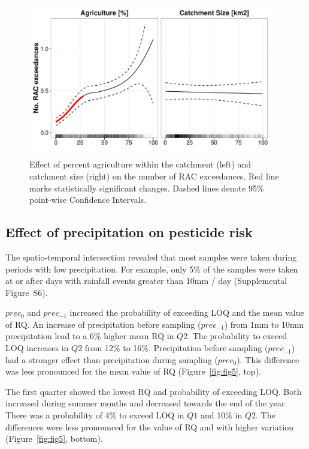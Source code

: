 \documentclass[journal=esthag,manuscript=article]{achemso}
\begin{document}
\begin{figure}[ht]
  \includegraphics[width=0.95\textwidth]{figure4.pdf}
  \caption{Effect of percent agriculture within the catchment (left) and catchment size (right) on the number of RAC exceedances. Red line marks statistically significant changes. Dashed lines denote 95\% point-wise Confidence Intervals.
  }
  \label{fig:fig4}
\end{figure}


\subsection{Effect of precipitation on pesticide risk}
The spatio-temporal intersection revealed that most samples were taken during periods with low precipitation.
For example, only 5\% of the samples were taken at or after days with rainfall events greater than 10mm / day (Supplemental Figure~S6). 

$prec_{0}$ and $prec_{-1}$ increased the probability of exceeding LOQ and the mean value of RQ.
An increase of precipitation before sampling ($prec_{-1}$) from 1mm to 10mm precipitation lead to a 6\% higher mean RQ in $Q2$.
The probability to exceed LOQ increases in $Q2$ from  12\% to 16\%.
Precipitation before sampling ($prec_{-1}$) had a stronger effect than precipitation during sampling ($prec_{0}$). 
This difference was less pronounced for the mean value of RQ (Figure~\ref{fig:fig5}, top). 

The first quarter showed the lowest RQ and probability of exceeding LOQ.
Both increased during summer months and decreased towards the end of the year.
There was a probability of 4\% to exceed LOQ in $Q1$ and 10\% in $Q2$.
The differences were less pronounced for the value of RQ and with higher variation (Figure~\ref{fig:fig5}, bottom).
\end{document}
